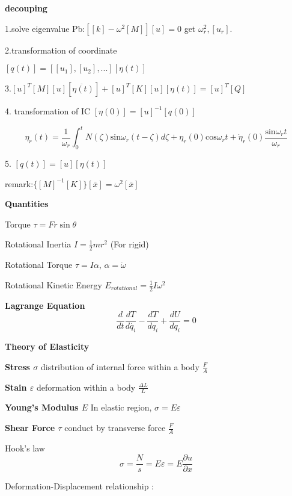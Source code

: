 \documentclass{article}
\begin{document}
\begin{multicols*}{3}
\noindent\textbf{decouping}

1.solve eigenvalue Pb:$[[k]-\omega^{2}[M]][u]=0$
get $\omega_{r}^{2},[u_{r}]$.

2.transformation of coordinate

$[q(t)]=[[u_{1}],[u_{2}],...][\eta(t)]$

3.$[u]^{T}[M][u][\ddot{\eta(t)}]+[u]^{T}[K][u][\eta(t)]=[u]^{T}[Q]$

4. transformation of IC $[\eta(0)]=[u]^{-1}[q(0)]$

\begin{equation*}
\eta_{r}(t)=\frac{1}{\omega_{r}}\int_{0}^{t}N(\zeta)\text{sin}\omega_{r}(t-\zeta)d\zeta+\eta_{r}(0)\text{cos}\omega_{r}t+\dot{\eta}_{r}(0)\frac{\text{sin}\omega_{r}t}{\omega_{r}}
\end{equation*}

5. $[q(t)]=[u][\eta(t)]$

remark:$\{[M]^{-1}[K]\}[\bar{x}]=\omega^{2}[\bar{x}]$


\noindent\textbf{Quantities}

   Torque $\tau = Fr \sin\theta$

  Rotational Inertia $I=\frac{1}{2}mr^2$ (For rigid)

  Rotational Torque $\tau = I\alpha$, $\alpha = \dot{\omega}$

  Rotational Kinetic Energy $E_{rotational}=\frac{1}{2}I\omega^2$


  \noindent\textbf{Lagrange Equation}
  \begin{equation*}
    \frac{d}{dt}\frac{dT}{d\dot{q_i}} - \frac{dT}{dq_i} + \frac{dU}{dq_i} = 0
  \end{equation*}

  \noindent\textbf{Theory of Elasticity}

\textbf{Stress $\sigma$} distribution of internal force within a body $\frac{F}{A}$

\textbf{Stain $\varepsilon$} deformation within a body $\frac{\Delta L}{L}$

 \textbf{Young's Modulus $E$} In elastic region, $\sigma = E\varepsilon$

\textbf{Shear Force $\tau$} conduct by transverse force $\frac{F}{A}$

  Hook's law
  \begin{equation*}
    \sigma=\frac{N}{s}=E\varepsilon=E\frac{\partial u}{\partial x}
  \end{equation*}

  Deformation-Displacement relationship :


\end{multicols*}
\end{document}
